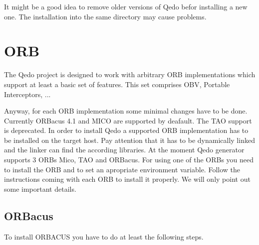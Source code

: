 \documentclass[12pt,a4paper]{report}
\begin{document}
It might be a good idea to remove older versions of Qedo befor installing a new one. The installation into the same directory may cause problems.


\section{ORB}
\label{sec:ORB}
The Qedo project is designed to work with arbitrary ORB implementations which support at least a basic set of features. This set comprises OBV, Portable Interceptors, ... 

Anyway, for each ORB implementation some minimal changes have to be done. Currently ORBacus 4.1 and MICO are supported by deafault. The TAO support is deprecated. In order to install Qedo a supported ORB implementation has to be installed on the target host. Pay attention that it has to be dynamically linked and the linker can find the according libraries. At the moment Qedo generator supports 3 ORBs Mico, TAO and ORBacus. For using one of the ORBs you need to install the ORB and to set an apropriate environment variable. Follow the instructions coming with each ORB to install it properly. We will only point out some important details.

\subsection{ORBacus}
\label{sec:ORBacus}
To install ORBACUS you have to do at least the following steps.
\end{document}
